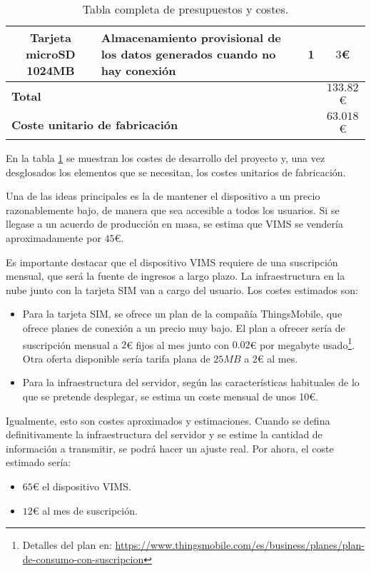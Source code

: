 \begin{table}[H]
\begin{tabularx}{\textwidth}{|c|X|c|c|}
    Tarjeta microSD 1024MB                                       & Almacenamiento provisional de los datos generados cuando no hay conexión & 1                 & $3$€            \\
    \hline
    \hline
    \multicolumn{3}{|l|}{\textbf{Total}}                         & $133.82$€                                                                                                      \\
    \hline
    \multicolumn{3}{|l|}{\textbf{Coste unitario de fabricación}} & $63.018$€                                                                                                      \\
    \hline
  \end{tabularx}
  \caption{Tabla completa de presupuestos y costes.}
  \label{tab:costs}
\end{table}

En la tabla \ref{tab:costs} se muestran los costes de desarrollo del proyecto
y, una vez desglosados los elementos que se necesitan, los costes unitarios
de fabricación.

Una de las ideas principales es la de mantener el dispositivo a un
precio razonablemente bajo, de manera que sea accesible a todos los usuarios.
Si se llegase a un acuerdo de producción en masa, se estima que \ac{VIMS}
se vendería aproximadamente por $45$€.

Es importante destacar que el dispositivo \ac{VIMS} requiere de una suscripción
mensual, que será la fuente de ingresos a largo plazo. La infraestructura
en la nube junto con la tarjeta SIM van a cargo del usuario. Los costes
estimados son:

\begin{itemize}
  \item Para la tarjeta SIM, se ofrece un plan de la compañía ThingsMobile,
        que ofrece planes de conexión a un precio muy bajo. El plan a
        ofrecer sería de suscripción mensual a $2$€ fijos al mes junto con
        $0.02$€ por megabyte usado\footnote{Detalles del plan en: \url{https://www.thingsmobile.com/es/business/planes/plan-de-consumo-con-suscripcion}}.
        Otra oferta disponible sería tarifa plana de $25MB$ a 2€ al mes.
  \item Para la infraestructura del servidor, según las características
        habituales de lo que se pretende desplegar, se estima un coste
        mensual de unos 10€.
\end{itemize}

Igualmente, esto son costes aproximados y estimaciones. Cuando se defina
definitivamente la infraestructura del servidor y se estime la cantidad
de información a transmitir, se podrá hacer un ajuste real. Por ahora,
el coste estimado sería:

\begin{itemize}
  \item $65$€ el dispositivo \ac{VIMS}.
  \item $12$€ al mes de suscripción.
\end{itemize}
